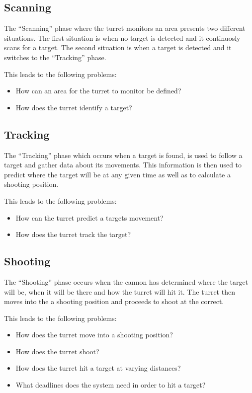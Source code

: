 \subsection{Scanning}
The ``Scanning'' phase where the turret monitors an area presents two different
situations. The first situation is when no target is detected and it continuosly
scans for a target. The second situation is when a target is detected and it
switches to the ``Tracking'' phase.\nl

This leads to the following problems:
\begin{itemize}
  \item How can an area for the turret to monitor be defined?
  \item How does the turret identify a target?
\end{itemize}

\subsection{Tracking}
The ``Tracking'' phase which occurs when a target is found, is used to follow a
target and gather data about its movements. This information is then used to
predict where the target will be at any given time as well as to calculate a
shooting position.\nl

This leads to the following problems:
\begin{itemize}
  \item How can the turret predict a targets movement?
  \item How does the turret track the target?
\end{itemize}

\subsection{Shooting}
The ``Shooting'' phase occurs when the cannon has determined where the target
will be, when it will be there and how the turret will hit it. The turret then moves
into the a shooting position and proceeds to shoot at the correct.\nl

This leads to the following problems:
\begin{itemize}
  \item How does the turret move into a shooting position?
  \item How does the turret shoot?
  \item How does the turret hit a target at varying distances?
  \item What deadlines does the system need in order to hit a target?
\end{itemize}


